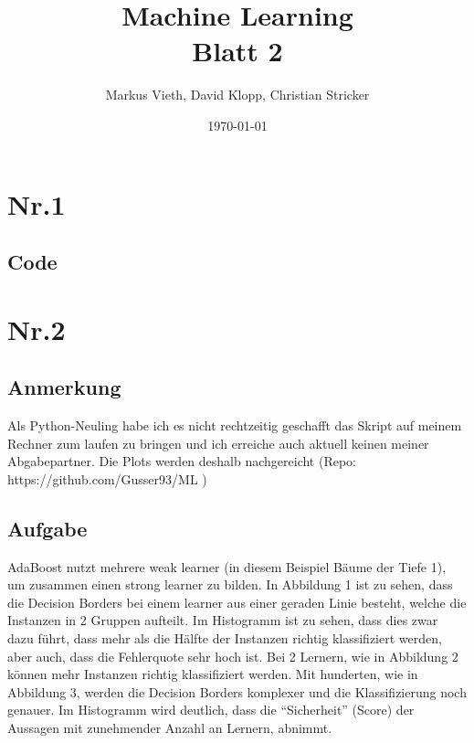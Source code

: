 \documentclass[a4paper,11pt,twoside]{article}
\title{Machine Learning\\ Blatt 2}
\author{Markus Vieth, David Klopp, Christian Stricker}
\date{\today}
\begin{document}
\newcommand{\cor}[1]{\textcolor{red}{\textit{#1}}}
\maketitle
\cleardoublepage
\pagestyle{myheadings}

\section*{Nr.1}
\subsection*{Code}


\section*{Nr.2}
\subsection*{Anmerkung}
Als Python-Neuling habe ich es nicht rechtzeitig geschafft das Skript auf meinem Rechner zum laufen zu bringen und ich erreiche auch aktuell keinen meiner Abgabepartner. Die Plots werden deshalb nachgereicht (Repo:  https://github.com/Gusser93/ML )
\subsection*{Aufgabe}
AdaBoost nutzt mehrere weak learner (in diesem Beispiel Bäume der Tiefe 1), um zusammen einen strong learner zu bilden. In Abbildung 1 ist zu sehen, dass die Decision Borders bei einem learner aus einer geraden Linie besteht, welche die Instanzen in 2 Gruppen aufteilt. Im Histogramm ist zu sehen, dass dies zwar dazu führt, dass mehr als die Hälfte der Instanzen richtig klassifiziert werden, aber auch, dass die Fehlerquote sehr hoch ist. Bei 2 Lernern, wie in Abbildung 2 können mehr Instanzen richtig klassifiziert werden. Mit hunderten, wie in Abbildung 3, werden die Decision Borders komplexer und die Klassifizierung noch genauer. Im Histogramm wird deutlich, dass die "`Sicherheit"' (Score) der Aussagen mit zunehmender Anzahl an Lernern, abnimmt.
\end{document}
